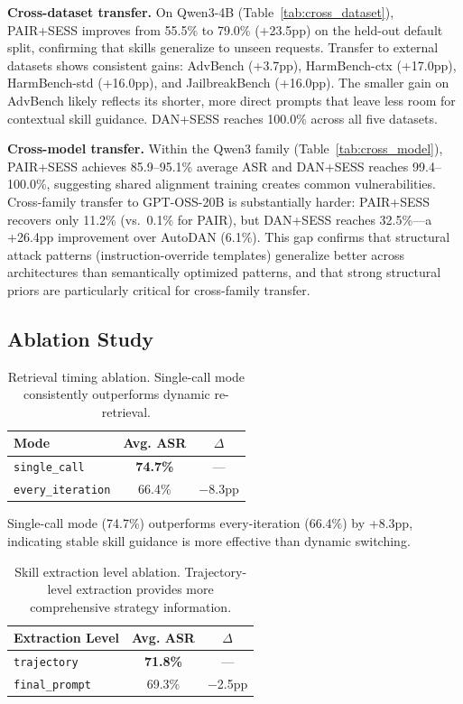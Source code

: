 \documentclass[letterpaper]{article}
\begin{document}
\textbf{Cross-dataset transfer.} On Qwen3-4B (Table~\ref{tab:cross_dataset}), PAIR+SESS improves from 55.5\% to 79.0\% (+23.5pp) on the held-out default split, confirming that skills generalize to unseen requests. Transfer to external datasets shows consistent gains: AdvBench (+3.7pp), HarmBench-ctx (+17.0pp), HarmBench-std (+16.0pp), and JailbreakBench (+16.0pp). The smaller gain on AdvBench likely reflects its shorter, more direct prompts that leave less room for contextual skill guidance. DAN+SESS reaches 100.0\% across all five datasets.

\textbf{Cross-model transfer.} Within the Qwen3 family (Table~\ref{tab:cross_model}), PAIR+SESS achieves 85.9--95.1\% average ASR and DAN+SESS reaches 99.4--100.0\%, suggesting shared alignment training creates common vulnerabilities. Cross-family transfer to GPT-OSS-20B is substantially harder: PAIR+SESS recovers only 11.2\% (vs.\ 0.1\% for PAIR), but DAN+SESS reaches 32.5\%---a +26.4pp improvement over AutoDAN (6.1\%). This gap confirms that structural attack patterns (instruction-override templates) generalize better across architectures than semantically optimized patterns, and that strong structural priors are particularly critical for cross-family transfer.

\subsection{Ablation Study}

\begin{table}[t]
\centering
\caption{Retrieval timing ablation. Single-call mode consistently outperforms dynamic re-retrieval.}
\label{tab:retrieval_timing}
\small
\begin{tabular}{lcc}
\toprule
\textbf{Mode} & \textbf{Avg. ASR} & \textbf{$\Delta$} \\
\midrule
\texttt{single\_call} & \textbf{74.7\%} & --- \\
\texttt{every\_iteration} & 66.4\% & $-$8.3pp \\
\bottomrule
\end{tabular}
\end{table}

Single-call mode (74.7\%) outperforms every-iteration (66.4\%) by +8.3pp, indicating stable skill guidance is more effective than dynamic switching.

\begin{table}[t]
\centering
\caption{Skill extraction level ablation. Trajectory-level extraction provides more comprehensive strategy information.}
\label{tab:extraction_level}
\small
\begin{tabular}{lcc}
\toprule
\textbf{Extraction Level} & \textbf{Avg. ASR} & \textbf{$\Delta$} \\
\midrule
\texttt{trajectory} & \textbf{71.8\%} & --- \\
\texttt{final\_prompt} & 69.3\% & $-$2.5pp \\
\bottomrule
\end{tabular}
\end{table}
\end{document}
